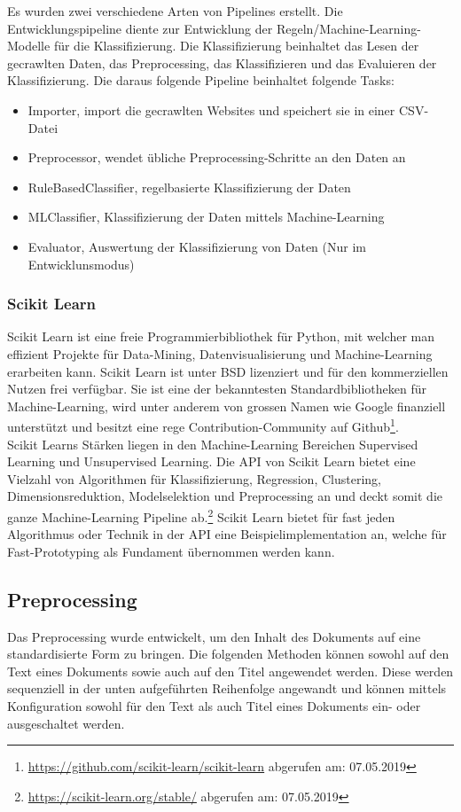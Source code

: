 Es wurden zwei verschiedene Arten von Pipelines erstellt.
Die Entwicklungspipeline diente zur Entwicklung der Regeln/Machine-Learning-Modelle für die Klassifizierung.
Die Klassifizierung beinhaltet das Lesen der gecrawlten Daten, das Preprocessing, das Klassifizieren und das Evaluieren der Klassifizierung.
Die daraus folgende Pipeline beinhaltet folgende Tasks:
\begin{itemize}
	\item Importer, import die gecrawlten Websites und speichert sie in einer CSV-Datei
	\item Preprocessor, wendet übliche Preprocessing-Schritte an den Daten an
	\item RuleBasedClassifier, regelbasierte Klassifizierung der Daten 
	\item MLClassifier, Klassifizierung der Daten mittels Machine-Learning
	\item Evaluator, Auswertung der Klassifizierung von Daten (Nur im Entwicklunsmodus)
\end{itemize}
\subsubsection{Scikit Learn}
Scikit Learn ist eine freie Programmierbibliothek für Python, mit welcher man effizient Projekte für Data-Mining, Datenvisualisierung und Machine-Learning erarbeiten kann.
Scikit Learn ist unter BSD lizenziert und für den kommerziellen Nutzen frei verfügbar.
Sie ist eine der bekanntesten Standardbibliotheken für Machine-Learning, wird unter anderem von grossen Namen wie Google finanziell unterstützt und besitzt eine rege Contribution-Community auf Github\footnote{\url{https://github.com/scikit-learn/scikit-learn} abgerufen am: 07.05.2019}.\\
Scikit Learns Stärken liegen in den Machine-Learning Bereichen \glqq Supervised Learning\grqq{} und \glqq Unsupervised Learning\grqq{}.
Die API von Scikit Learn bietet eine Vielzahl von Algorithmen für Klassifizierung, Regression, Clustering, Dimensionsreduktion, Modelselektion und Preprocessing an und deckt somit die ganze Machine-Learning Pipeline ab.\footnote{\url{https://scikit-learn.org/stable/} abgerufen am: 07.05.2019}
Scikit Learn bietet für fast jeden Algorithmus oder Technik in der API eine Beispielimplementation an, welche für Fast-Prototyping  als Fundament übernommen werden kann.
\subsection{Preprocessing}\label{preprocessing}
Das Preprocessing wurde entwickelt, um den Inhalt des Dokuments auf eine standardisierte Form zu bringen.
Die folgenden Methoden können sowohl auf den Text eines Dokuments sowie auch auf den Titel angewendet werden.
Diese werden sequenziell in der unten aufgeführten Reihenfolge angewandt und können mittels Konfiguration sowohl für den Text als auch Titel eines Dokuments ein- oder ausgeschaltet werden.

